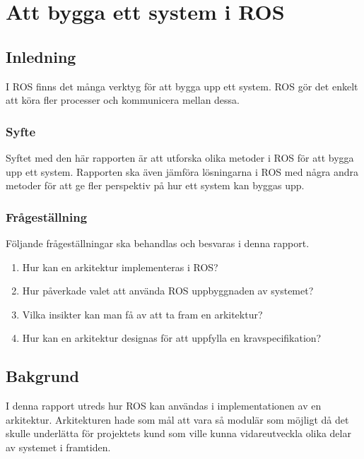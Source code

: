 \chapter{Att bygga ett system i ROS}
\label{cha:indiv-report-lundberg}

\section{Inledning}
\label{sec:introduction-lundberg}

I ROS finns det många verktyg för att bygga upp ett system. ROS gör det enkelt att köra fler processer och kommunicera mellan dessa.

\subsection{Syfte}
\label{sec:purpose-lundberg}

Syftet med den här rapporten är att utforska olika metoder i ROS för att bygga upp ett system. Rapporten ska även jämföra lösningarna i ROS med några andra metoder för att ge fler perspektiv på hur ett system kan byggas upp.

\subsection{Frågeställning}
\label{sec:issue-lundberg}

Följande frågeställningar ska behandlas och besvaras i denna rapport.

\begin{enumerate}
	\item Hur kan en arkitektur implementeras i ROS?
	
	\item Hur påverkade valet att använda ROS uppbyggnaden av systemet?
	
	\item Vilka insikter kan man få av att ta fram en arkitektur?
	
	\item Hur kan en arkitektur designas för att uppfylla en kravspecifikation?
\end{enumerate}


\section{Bakgrund}
\label{sec:background-lundberg}

I denna rapport utreds hur ROS kan användas i implementationen av en arkitektur. Arkitekturen hade som mål att vara så modulär som möjligt då det skulle underlätta för projektets kund som ville kunna vidareutveckla olika delar av systemet i framtiden.

